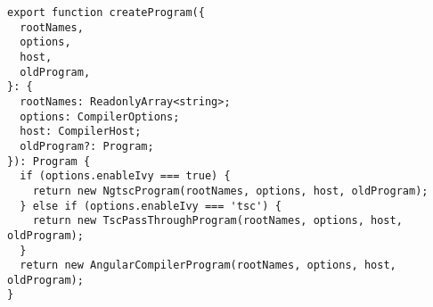 \begin{verbatim}
export function createProgram({
  rootNames,
  options,
  host,
  oldProgram,
}: {
  rootNames: ReadonlyArray<string>;
  options: CompilerOptions;
  host: CompilerHost;
  oldProgram?: Program;
}): Program {
  if (options.enableIvy === true) {
    return new NgtscProgram(rootNames, options, host, oldProgram);
  } else if (options.enableIvy === 'tsc') {
    return new TscPassThroughProgram(rootNames, options, host, oldProgram);
  }
  return new AngularCompilerProgram(rootNames, options, host, oldProgram);
}
\end{verbatim}
